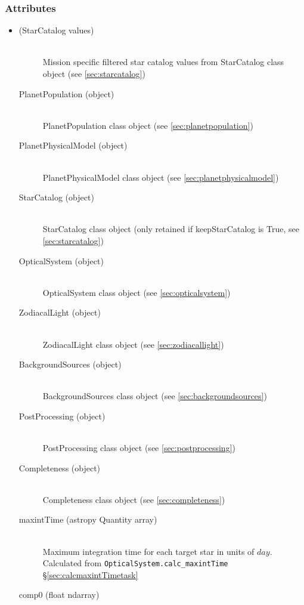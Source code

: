 \documentclass[cleanfoot]{asme2ej}
\begin{document}
\subsubsection*{Attributes}
\begin{itemize}
    \item 
    \begin{description}
        \item[(StarCatalog values)] \hfill \\
        Mission specific filtered star catalog values from StarCatalog class object (see \ref{sec:starcatalog})
        \item[PlanetPopulation (object)] \hfill \\
        PlanetPopulation class object (see \ref{sec:planetpopulation})
        \item[PlanetPhysicalModel (object)] \hfill \\
        PlanetPhysicalModel class object (see \ref{sec:planetphysicalmodel})
        \item[StarCatalog (object)]\hfill \\
        StarCatalog class object (only retained if keepStarCatalog is True, see \ref{sec:starcatalog})
        \item[OpticalSystem (object)] \hfill \\
        OpticalSystem class object (see \ref{sec:opticalsystem})
        \item[ZodiacalLight (object)] \hfill \\
        ZodiacalLight class object (see \ref{sec:zodiacallight})
        \item[BackgroundSources (object)] \hfill \\
        BackgroundSources class object (see \ref{sec:backgroundsources})
        \item[PostProcessing (object)] \hfill \\
        PostProcessing class object (see \ref{sec:postprocessing})
        \item[Completeness (object)] \hfill \\
        Completeness class object (see \ref{sec:completeness})
        \item[maxintTime (astropy Quantity array)] \hfill \\
        Maximum integration time for each target star in units of $ day $. Calculated from \verb+OpticalSystem.calc_maxintTime+ \S\ref{sec:calcmaxintTimetask}
        \item[comp0 (float ndarray)] \hfill \\

\end{description}
\end{itemize}
\end{document}
